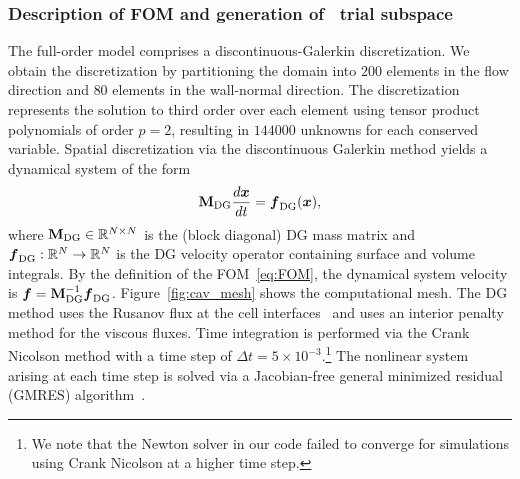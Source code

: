 \subsubsection{Description of FOM and generation of \spatialAcronym\ trial subspace}
The full-order model comprises a discontinuous-Galerkin discretization. We obtain the discretization 
by partitioning the domain into $200$ elements in the flow direction and $80$ elements 
in the wall-normal direction. The discretization represents the solution to third order over each element using tensor product polynomials of order $p=2$, 
resulting in $144000$ unknowns for each conserved variable. Spatial discretization via the discontinuous Galerkin method yields a dynamical system 
of the form
$$  \mathbf{M}_{\text{DG}}\frac{d \boldsymbol x}{dt} = \boldsymbol f_{\text{DG}} (\boldsymbol x),$$
where $\mathbf{M}_{\text{DG}} \in \mathbb{R}^{N \times N}$ is the (block diagonal) DG mass matrix and $\boldsymbol f_{\text{DG}}: \mathbb{R}^{N} \rightarrow \mathbb{R}^{N}$ is the DG velocity operator containing 
surface and volume integrals. By the definition of the FOM~\eqref{eq:FOM}, the dynamical system velocity is $\boldsymbol f = \mathbf{M}_{\text{DG}}^{-1} \boldsymbol f_{\text{DG}}$. 
Figure~\ref{fig:cav_mesh} shows the computational mesh. The 
DG method uses the Rusanov flux at the cell interfaces~\cite{rusanov} and uses an interior penalty method for the viscous fluxes. Time integration 
is performed via the Crank Nicolson method  with a time step of $\Delta t = 5 \times 10^{-3}.$\footnote{We note that the Newton solver in our code failed to converge for simulations using Crank Nicolson at a higher time step.} The nonlinear system arising at each time step is solved via a Jacobian-free general minimized residual (GMRES) algorithm~\cite{gmres,jfnk}. 
 
